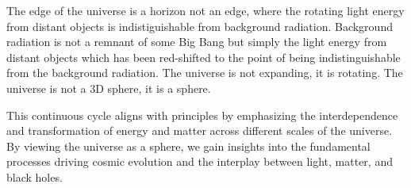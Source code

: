 \documentclass[12pt]{article}
\begin{document}
The edge of the universe is a horizon not an edge, where the rotating light energy from distant objects is indistiguishable from background radiation. Background radiation is not a remnant of some Big Bang but simply the light energy from distant objects which has been red-shifted to the point of being indistinguishable from the background radiation. The universe is not expanding, it is rotating. The universe is not a 3D sphere, it is a \iR{} sphere.

This continuous cycle aligns with \iR{} principles by emphasizing the interdependence and transformation of energy and matter across different scales of the universe. By viewing the universe as a \iR{} sphere, we gain insights into the fundamental processes driving cosmic evolution and the interplay between light, matter, and black holes.
\end{document}
